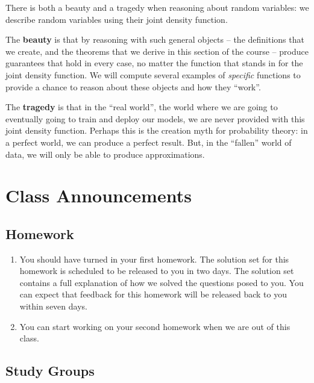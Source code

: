 \documentclass[
]{book}
\providecommand{\tightlist}{%
  \setlength{\itemsep}{0pt}\setlength{\parskip}{0pt}}
\theoremstyle{definition}
\theoremstyle{definition}
\theoremstyle{definition}
\theoremstyle{definition}
\theoremstyle{remark}
\begin{document}
There is both a beauty and a tragedy when reasoning about random variables: we describe random variables using their joint density function.

The \textbf{beauty} is that by reasoning with such general objects -- the definitions that we create, and the theorems that we derive in this section of the course -- produce guarantees that hold in every case, no matter the function that stands in for the joint density function. We will compute several examples of \emph{specific} functions to provide a chance to reason about these objects and how they ``work''.

The \textbf{tragedy} is that in the ``real world'', the world where we are going to eventually going to train and deploy our models, we are never provided with this joint density function. Perhaps this is the creation myth for probability theory: in a perfect world, we can produce a perfect result. But, in the ``fallen'' world of data, we will only be able to produce approximations.

\hypertarget{class-announcements}{%
\section{Class Announcements}\label{class-announcements}}

\hypertarget{homework}{%
\subsection*{Homework}\label{homework}}

\begin{enumerate}
\def\labelenumi{\arabic{enumi}.}
\tightlist
\item
  You should have turned in your first homework. The solution set for this homework is scheduled to be released to you in two days. The solution set contains a full explanation of how we solved the questions posed to you. You can expect that feedback for this homework will be released back to you within seven days.
\item
  You can start working on your second homework when we are out of this class.
\end{enumerate}

\hypertarget{study-groups}{%
\subsection*{Study Groups}\label{study-groups}}
\end{document}
